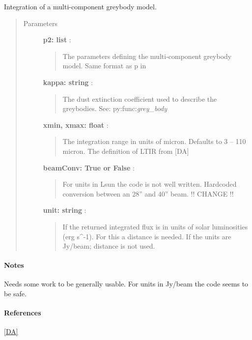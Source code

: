 \documentclass[a4paper,10pt,english]{sphinxmanual}
\begin{document}
\begin{fulllineitems}
\label{functions:astrolyze.functions.astro_functions.LTIR}
Integration of a multi-component greybody model.
\begin{quote}\begin{description}
\item[{Parameters }] \leavevmode
\textbf{p2: list} :
\begin{quote}

The parameters defining the multi-component greybody model. Same format
as p in
\end{quote}

\textbf{kappa: string} :
\begin{quote}

The dust extinction coefficient used to describe the greybodies. See:
py:func:\emph{grey\_body}
\end{quote}

\textbf{xmin, xmax: float} :
\begin{quote}

The integration range in units of micron. Defaults to 3 -- 110 micron.
The definition of LTIR from {[}DA{]}
\end{quote}

\textbf{beamConv: True or False} :
\begin{quote}

For units in Lsun the code is not well written. Hardcoded conversion
between an 28'' and 40'' beam. !! CHANGE !!
\end{quote}

\textbf{unit: string} :
\begin{quote}

If  the returned integrated flux is in units of solar
luminosities (erg s\textasciicircum{}-1). For this a distance is needed. If 
the units are Jy/beam; distance is not used.
\end{quote}

\end{description}\end{quote}
\paragraph{Notes}

Needs some work to be generally usable. For units in Jy/beam the code seems
to be safe.
\paragraph{References}

{\hyperref[functions:da]{{[}DA{]}}}

\end{fulllineitems}
\end{document}
